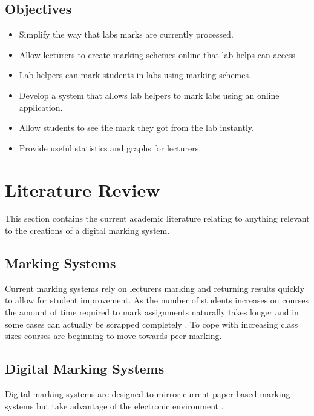 \documentclass[12pt]{article}  %
\theoremstyle{definition}
\theoremstyle{remark}
\begin{document}
\subsection{Objectives}
\begin{itemize}
\item Simplify the way that labs marks are currently processed.
\item Allow lecturers to create marking schemes online that lab helps can access
\item Lab helpers can mark students in labs using marking schemes.
\item Develop a system that allows lab helpers to mark labs using an online application.
\item Allow students to see the mark they got from the lab instantly.
\item Provide useful statistics and graphs for lecturers.
\end{itemize}




\newpage
\section{Literature Review}
This section contains the current academic literature relating to anything relevant to the creations of a digital marking system.


\subsection {Marking Systems}
Current marking systems rely on lecturers marking and returning results quickly to allow for student improvement. As the number of students increases on courses the amount of time required to mark assignments naturally takes longer and in some cases can actually be scrapped completely \cite{brown_assessment_1999}. To cope with increasing class sizes courses are beginning to move towards peer marking.


\subsection{Digital Marking Systems}
Digital marking systems are designed to mirror current paper based marking systems but take advantage of the electronic environment \cite{joy_effective_1998}.
\end{document}
